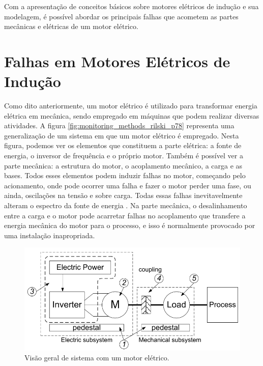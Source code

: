 Com a apresentação de conceitos básicos sobre motores elétricos de indução e sua modelagem, é possível abordar os principais falhas que 
acometem as partes mecânicas e elétricas de um motor elétrico.


% 

\section{Falhas em Motores Elétricos de Indução}\label{sec:}

Como dito anteriormente, um motor elétrico é utilizado para transformar energia elétrica em mecânica, sendo empregado em máquinas que podem
realizar diversas atividades. A figura \ref{fig:monitoring_methods_rilski_p78} representa uma generalização de um sistema em que um motor
elétrico é empregado. Nesta figura, podemos ver os elementos que constituem a parte elétrica: a fonte de energia, o inversor de frequência e
o próprio motor. Também é possível ver a parte mecânica: a estrutura do motor, o acoplamento mecânico, a carga e as bases. Todos esses
elementos podem induzir falhas no motor, começando pelo acionamento, onde pode ocorrer uma falha e fazer o motor perder uma fase, ou ainda, 
oscilações na tensão e sobre carga. Todas essas falhas inevitavelmente alteram o espectro da fonte de energia . 
Na parte mecânica, o desalinhamento entre a carga e o motor pode acarretar falhas no acoplamento que transfere a energia mecânica do motor
para o processo, e isso é normalmente provocado por uma instalação inapropriada.

\begin{figure}[H]
    \caption{Visão geral de sistema com um motor elétrico.}
    \begin{center}
        \includegraphics[scale=.45]{referencial/img/motor_system_rilski_p2.png}
    \end{center}
    \label{fig:motor_system_rilski_p2}
\end{figure}

